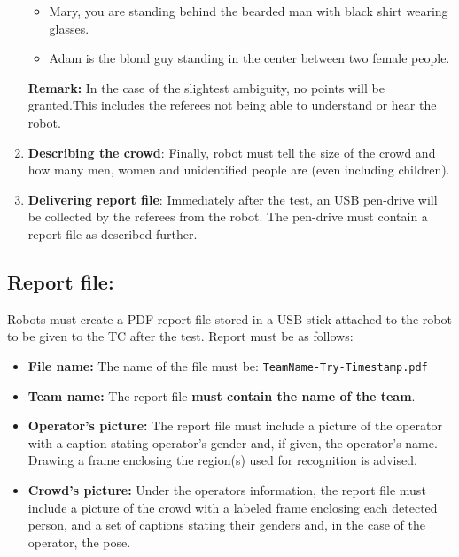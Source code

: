 \begin{enumerate}
\begin{itemize}
    \item Mary, you are standing behind the bearded man with black shirt wearing glasses.

    \item Adam is the blond guy standing in the center between two female people.
  \end{itemize}

  \textbf{Remark:} In the case of the slightest ambiguity, no points will be granted.This includes the referees not being able to understand or hear the robot.

  \item \textbf{Describing the crowd}: Finally, robot must tell the size of the crowd and how many men, women and unidentified people are (even including children).

  \item \textbf{Delivering report file}: Immediately after the test, an USB pen-drive will be collected by the referees from the robot. The pen-drive must contain a report file as described further.
\end{enumerate}

\subsection{Report file:}
Robots must create a PDF report file stored in a USB-stick attached to the robot to be given to the TC after the test. Report must be as follows:
\begin{itemize}

  \item \textbf{File name:} The name of the file must be: \texttt{TeamName-Try-Timestamp.pdf}

  \item \textbf{Team name:} The report file \textbf{must contain the name of the team}.

  \item \textbf{Operator's picture: } The report file must include a picture of the operator with a caption stating operator's gender and, if given, the operator's name. Drawing a frame enclosing the region(s) used for recognition is advised.

  \item \textbf{Crowd's picture:} Under the operators information, the report file must include a picture of the crowd with a labeled frame enclosing each detected person, and a set of captions stating their genders and, in the case of the operator, the pose. 
\end{itemize}

